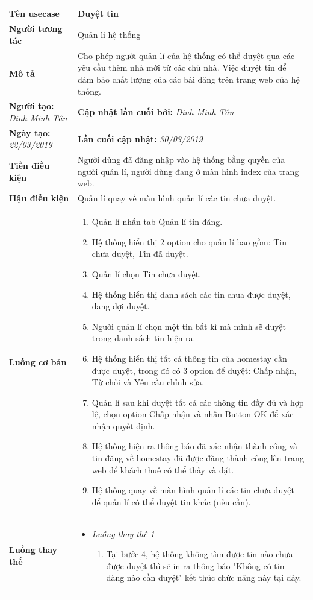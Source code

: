 \begin{center}
	\begin{longtable}{ | l |p{10cm}|}
		\hline
		\textbf{Tên usecase} & Duyệt tin \\ \hline
		\textbf{Người tương tác} & Quản lí hệ thống \\ \hline   
		\textbf{Mô tả} &  Cho phép người quản lí của hệ thống có thể duyệt qua các yêu cầu thêm nhà mới từ các chủ nhà. Việc duyệt tin để đảm bảo chất lượng của các bài đăng trên trang web của hệ thống.\\ \hline  
		\textbf{Người tạo:} \textit{Đinh Minh Tân} & \textbf{Cập nhật lần cuối bởi:} \textit{Đinh Minh Tân} \\ \hline
		\textbf{Ngày tạo:} \textit{22/03/2019} & \textbf{Lần cuối cập nhật:} \textit{30/03/2019} \\ \hline
		\textbf{Tiền điều kiện} &  Người dùng đã đăng nhập vào hệ thống bằng quyền của người quản lí, người dùng đang ở màn hình index của trang web. \\ \hline 
		\textbf{Hậu điều kiện} &  Quản lí quay về màn hình quản lí các tin chưa duyệt. \\ \hline 
		\textbf{Luồng cơ bản} & 
		\begin{enumerate}
			\item Quản lí nhấn tab Quản lí tin đăng.
			\item Hệ thống hiển thị 2 option cho quản lí bao gồm: Tin chưa duyệt, Tin đã duyệt.
			\item Quản lí chọn Tin chưa duyệt.
			\item Hệ thống hiển thị danh sách các tin chưa được duyệt, đang đợi duyệt.
			\item Người quản lí chọn một tin bất kì mà mình sẽ duyệt trong danh sách tin hiện ra.
			\item Hệ thống hiển thị tất cả thông tin của homestay cần được duyệt, trong đó có 3 option để duyệt: Chấp nhận, Từ chối và Yêu cầu chỉnh sửa.
			\item Quản lí sau khi duyệt tất cả các thông tin đầy đủ và hợp lệ, chọn option Chấp nhận và nhấn Button OK để xác nhận quyết định.
			\item Hệ thống hiện ra thông báo đã xác nhận thành công và tin đăng về homestay đã được đăng thành công lên trang web để khách thuê có thể thấy và đặt.
			\item Hệ thống quay về màn hình quản lí các tin chưa duyệt để quản lí có thể duyệt tin khác (nếu cần).
		\end{enumerate} \\ \hline 
		\textbf{Luồng thay thế} & 
		\begin{itemize} 
			\item \textit{Luồng thay thế 1}
			\begin{enumerate}
				\item Tại bước 4, hệ thống không tìm được tin nào chưa được duyệt thì sẽ in ra thông báo "Không có tin đăng nào cần duyệt" kết thúc chức năng này tại đây.
			\end{enumerate}
			

\end{itemize}
\end{longtable}
\end{center}
